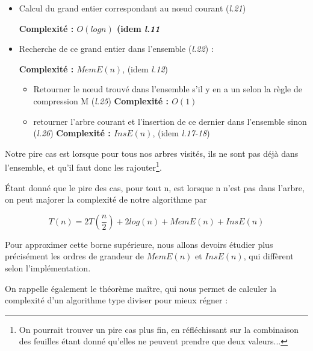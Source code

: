 \documentclass[12pt,a4paper]{article}
\begin{document}
\begin{itemize}
\item Calcul du grand entier correspondant au nœud courant (\textit{l.21})

\textbf{Complexité : $O(log n)$ (idem \textit{l.11}} 

\item Recherche de ce grand entier dans l'ensemble (\textit{l.22}) :

\textbf{Complexité : $MemE(n)$}, (idem \textit{l.12})

\begin{itemize}
\item Retourner le nœud trouvé dans l'ensemble s'il y en a un selon la règle de compression M (\textit{l.25})
\textbf{Complexité : $O(1)$}

\item retourner l'arbre courant et l'insertion de ce dernier dans l'ensemble sinon (\textit{l.26})
\textbf{Complexité : $InsE(n)$}, (idem \textit{l.17-18})

\end{itemize}

\end{itemize}

Notre pire cas est lorsque pour tous nos arbres visités, ils ne sont pas déjà dans l'ensemble, et qu'il faut donc les rajouter\footnote{On pourrait trouver un pire cas plus fin, en réfléchissant sur la combinaison des feuilles étant donné qu'elles ne peuvent prendre que deux valeurs...}.


Étant donné que le pire des cas, pour tout n, est lorsque n n'est pas dans l'arbre, on peut majorer la complexité de notre algorithme par 

$$
T(n) = 2 T(\frac{n}{2}) + 2log(n) + MemE(n) + InsE(n)
$$

Pour approximer cette borne supérieure, nous allons devoirs étudier plus précisément les ordres de grandeur de $MemE(n)$ et $InsE(n)$, qui diffèrent selon l'implémentation.

On rappelle également le théorème maître, qui nous permet de calculer la complexité d'un algorithme type diviser pour mieux régner : 
\end{document}

